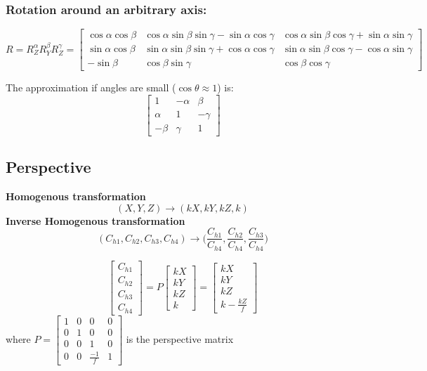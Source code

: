 \documentclass{article}
\begin{document}
\subsubsection*{Rotation around an arbitrary axis:}
\[R=R_Z^\alpha R_Y^\beta R_Z^\gamma=\begin{bmatrix}
    \cos\alpha\cos\beta & \cos\alpha\sin\beta\sin\gamma - \sin\alpha\cos\gamma &
    \cos\alpha\sin\beta\cos\gamma + \sin\alpha\sin\gamma \\
    \sin\alpha\cos\beta & \sin\alpha\sin\beta\sin\gamma + \cos\alpha\cos\gamma &
    \sin\alpha\sin\beta\cos\gamma - \cos\alpha\sin\gamma \\
    -\sin\beta & \cos\beta\sin\gamma & \cos\beta\cos\gamma
\end{bmatrix}\]

The approximation if angles are small ($\cos\theta \approx 1$) is:
\[\begin{bmatrix}
    1 & -\alpha & \beta \\
    \alpha & 1 & -\gamma \\
    -\beta & \gamma & 1
\end{bmatrix}\]

\subsection*{Perspective}
\textbf{Homogenous transformation}
\[(X, Y, Z) \rightarrow (kX, kY, kZ, k)\]
\textbf{Inverse Homogenous transformation}
\[(C_{h1}, C_{h2}, C_{h3}, C_{h4}) \rightarrow \Big(\frac{C_{h1}}{C_{h4}}, \frac{C_{h2}}{C_{h4}},
\frac{C_{h3}}{C_{h4}}\Big)\]

\[\begin{bmatrix}
    C_{h1} \\ C_{h2} \\ C_{h3} \\ C_{h4}
\end{bmatrix} = P \begin{bmatrix}
    kX \\ kY \\ kZ \\ k
\end{bmatrix}=\begin{bmatrix}
    kX \\ kY \\ kZ \\ k - \frac{kZ}{f}
\end{bmatrix}\] where $P=\begin{bmatrix}
    1 & 0 & 0 & 0 \\
    0 & 1 & 0 & 0 \\
    0 & 0 & 1 & 0 \\
    0 & 0 & \frac{-1}{f} & 1
\end{bmatrix}$ is the perspective matrix
\end{document}
